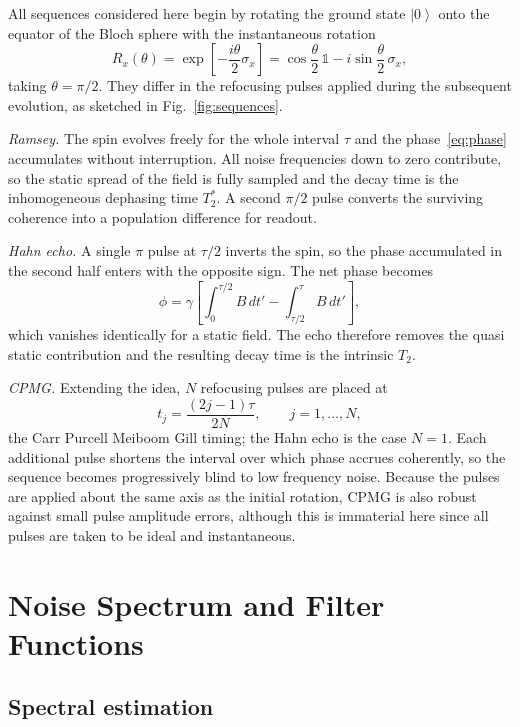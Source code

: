 \documentclass[conference]{IEEEtran}
\newcommand{\ket}[1]{\left|#1\right\rangle}
\begin{document}
All sequences considered here begin by rotating the ground state $\ket{0}$ onto
the equator of the Bloch sphere with the instantaneous rotation
\begin{equation}
R_x(\theta) = \exp\left[-\frac{i\theta}{2}\sigma_x\right]
= \cos\frac{\theta}{2}\,\mathbb{1} - i\sin\frac{\theta}{2}\,\sigma_x ,
\end{equation}
taking $\theta = \pi/2$. They differ in the refocusing pulses applied during the
subsequent evolution, as sketched in Fig.~\ref{fig:sequences}.

\emph{Ramsey.} The spin evolves freely for the whole interval $\tau$ and the
phase~\eqref{eq:phase} accumulates without interruption. All noise frequencies
down to zero contribute, so the static spread of the field is fully sampled and
the decay time is the inhomogeneous dephasing time $T_2^{*}$. A second $\pi/2$
pulse converts the surviving coherence into a population difference for readout.

\emph{Hahn echo.} A single $\pi$ pulse at $\tau/2$ inverts the spin, so the phase
accumulated in the second half enters with the opposite sign. The net phase
becomes
\begin{equation}
\phi = \gamma\left[\int_0^{\tau/2}\! B\,dt' - \int_{\tau/2}^{\tau}\! B\,dt'\right],
\end{equation}
which vanishes identically for a static field. The echo therefore removes the
quasi static contribution and the resulting decay time is the intrinsic $T_2$.

\emph{CPMG.} Extending the idea, $N$ refocusing pulses are placed at
\begin{equation}
t_j = \frac{(2j-1)\tau}{2N}, \qquad j=1,\dots,N ,
\end{equation}
the Carr Purcell Meiboom Gill timing; the Hahn echo is the case $N=1$. Each
additional pulse shortens the interval over which phase accrues coherently, so
the sequence becomes progressively blind to low frequency noise. Because the pulses
are applied about the same axis as the initial rotation, CPMG is also robust
against small pulse amplitude errors, although this is immaterial here since all
pulses are taken to be ideal and instantaneous.

\section{Noise Spectrum and Filter Functions}\label{sec:psd}

\subsection{Spectral estimation}
\end{document}
